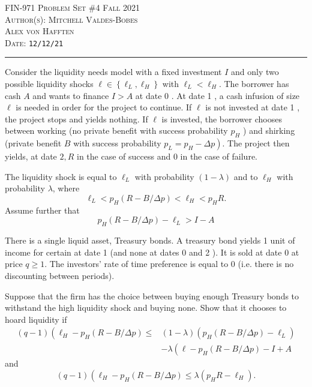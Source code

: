 \documentclass[12pt]{article}
\begin{document}
\thispagestyle{empty}


{\scshape FIN-971} \hfill {\scshape \Large Problem Set \#4} \hfill {\scshape Fall 2021}\\
{\scshape Author(s): \hfill Mitchell Valdes-Bobes\\  \phantom{This text will be invisible} \hfill Alex von Hafften}\\
{\scshape Date: \hfill \texttt{12/12/21}}\\
\medskip

\hrule

\bigskip

\bigskip
    
\begin{exercise}
    Consider the liquidity needs model with a fixed investment $I$ and only two possible liquidity shocks $\ell \in\left\{\ell_{L}, \ell_{H}\right\}$ with $\ell_{L}<\ell_{H}$. The borrower has cash $A$ and wants to finance $I>A$ at date 0 . At date 1 , a cash infusion of size $\ell$ is needed in order for the project to continue. If $\ell$ is not invested at date 1 , the project stops and yields nothing. If $\ell$ is invested, the borrower chooses between working (no private benefit with success probability $p_H$ ) and shirking (private benefit $B$ with success probability $\left.p_L=p_H-\Delta p\right)$. The project then yields, at date $2, R$ in the case of success and 0 in the case of failure.

The liquidity shock is equal to $\ell_{L}$ with probability $(1-\lambda)$ and to $\ell_{H}$ with probability $\lambda$, where
\[
\ell_{L}<p_H(R-B / \Delta p)<\ell_{H}<p_H R .
\]
Assume further that
\[
p_H(R-B / \Delta p)-\ell_{L}>I-A
\]

There is a single liquid asset, Treasury bonds. A treasury bond yields 1 unit of income for certain at date 1 (and none at dates 0 and 2 ). It is sold at date 0 at price $q \geq 1$. The investors' rate of time preference is equal to 0 (i.e. there is no discounting between periods).
\end{exercise}
\begin{subexercise}
    Suppose that the firm has the choice between buying enough Treasury bonds to withstand the high liquidity shock and buying none. Show that it chooses to hoard liquidity if
    \begin{equation}\label{eq:liquidity-needs-5.5-1}
    \begin{aligned}
    (q-1)\left(\ell_{H}-p_H(R-B / \Delta p) \leq\right.&(1-\lambda)\left(p_H(R-B / \Delta p)-\ell_{L}\right) \\
    &-\lambda\left(\ell-p_H(R-B / \Delta p)-I+A\right.
    \end{aligned}
    \end{equation}
    and
    \begin{equation}\label{eq:liquidity-needs-5.5-2}
        (q-1)\left(\ell_{H}-p_H(R-B / \Delta p) \leq \lambda\left(p_H R-\ell_{H}\right) .\right.
    \end{equation}
\end{subexercise}
\end{document}
